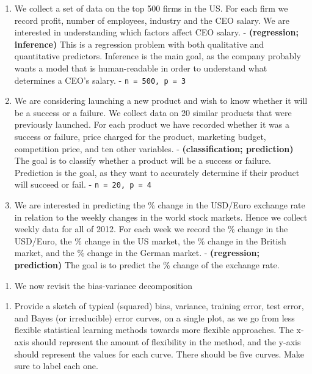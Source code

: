 \documentclass[]{book}
\providecommand{\tightlist}{%
  \setlength{\itemsep}{0pt}\setlength{\parskip}{0pt}}
\theoremstyle{definition}
\theoremstyle{definition}
\theoremstyle{definition}
\theoremstyle{remark}
\begin{document}
\begin{enumerate}
\def\labelenumi{(\alph{enumi})}
\tightlist
\item
  We collect a set of data on the top 500 firms in the US. For each firm
  we record profit, number of employees, industry and the CEO salary. We
  are interested in understanding which factors affect CEO salary. -
  \textbf{(regression; inference)} This is a regression problem with
  both qualitative and quantitative predictors. Inference is the main
  goal, as the company probably wants a model that is human-readable in
  order to understand what determines a CEO's salary. -
  \texttt{n\ =\ 500,\ p\ =\ 3}
\item
  We are considering launching a new product and wish to know whether it
  will be a success or a failure. We collect data on 20 similar products
  that were previously launched. For each product we have recorded
  whether it was a success or failure, price charged for the product,
  marketing budget, competition price, and ten other variables. -
  \textbf{(classification; prediction)} The goal is to classify whether
  a product will be a success or failure. Prediction is the goal, as
  they want to accurately determine if their product will succeed or
  fail. - \texttt{n\ =\ 20,\ p\ =\ 4}
\item
  We are interested in predicting the \% change in the USD/Euro exchange
  rate in relation to the weekly changes in the world stock markets.
  Hence we collect weekly data for all of 2012. For each week we record
  the \% change in the USD/Euro, the \% change in the US market, the \%
  change in the British market, and the \% change in the German market.
  - \textbf{(regression; prediction)} The goal is to predict the \%
  change of the exchange rate.
\end{enumerate}

\begin{enumerate}
\def\labelenumi{\arabic{enumi}.}
\setcounter{enumi}{2}
\tightlist
\item
  We now revisit the bias-variance decomposition
\end{enumerate}

\begin{enumerate}
\def\labelenumi{(\alph{enumi})}
\tightlist
\item
  Provide a sketch of typical (squared) bias, variance, training error,
  test error, and Bayes (or irreducible) error curves, on a single plot,
  as we go from less flexible statistical learning methods towards more
  flexible approaches. The x-axis should represent the amount of
  flexibility in the method, and the y-axis should represent the values
  for each curve. There should be five curves. Make sure to label each
  one.
\end{enumerate}
\end{document}
